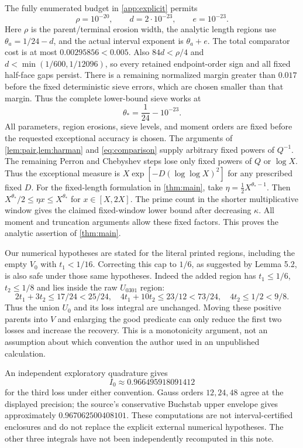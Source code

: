 The fully enumerated budget in \cref{app:explicit} permits
\[
 \rho=10^{-20},\qquad d=2\cdot10^{-23},\qquad e=10^{-23}.
\]
Here $\rho$ is the parent/terminal erosion width, the analytic
length regions use $\theta_a=1/24-d$, and the actual interval
exponent is $\theta_a+e$.
The total comparator cost is at most $0.00295856<0.005$.
Also $84d<\rho/4$ and $d<\min(1/600,1/12096)$, so every retained
endpoint-order sign and all fixed half-face gaps persist.
There is a remaining normalized margin greater than $0.017$ before
the fixed deterministic sieve errors, which are chosen smaller
than that margin. Thus the complete lower-bound sieve works at
\[
                 \theta_*=\frac1{24}-10^{-23}.
\]
All parameters, region erosions, sieve levels, and moment orders
are fixed before the requested exceptional accuracy is chosen.
The arguments of \cref{lem:pair,lem:harman} and
\eqref{eq:comparison} supply arbitrary fixed powers of
$Q^{-1}$.
The remaining Perron and Chebyshev steps lose only fixed powers of
$Q$ or $\log X$.
Thus the exceptional measure is
$X\exp[-D(\log\log X)^2]$ for any prescribed fixed $D$.
For the fixed-length formulation in \cref{thm:main}, take
$\eta=\tfrac12 X^{\theta_*-1}$. Then
$X^{\theta_*}/2\le\eta x\le X^{\theta_*}$ for $x\in[X,2X]$.
The prime count in the shorter multiplicative window gives the
claimed fixed-window lower bound after decreasing $\kappa$.
All moment and truncation arguments allow these fixed factors.
This proves the analytic assertion of \cref{thm:main}.

\begin{remark}
Our numerical hypotheses are stated for the literal printed regions,
including the empty $V_0$ with $t_1<1/16$.
Correcting this cap to $1/6$, as suggested by Lemma 5.2, is also safe
under those same hypotheses. Indeed the added region has
$t_1\le1/6$, $t_2\le1/8$ and lies inside the raw $U_{0301}$ region:
\[
 2t_1+3t_2\le17/24<25/24,\quad
 4t_1+10t_2\le23/12<73/24,\quad 4t_2\le1/2<9/8.
\]
Thus the union $U_0$ and its loss integral are unchanged.
Moving these positive parents into $V$ and enlarging the good predicate
can only reduce the first two losses and increase the recovery.
This is a monotonicity argument, not an assumption about which
convention the author used in an unpublished calculation.

An independent exploratory quadrature gives
\[
 I_0\approx0.966495918091412
\]
for the third loss under either convention. Gauss orders $12,24,48$
agree at the displayed precision; the source's conservative Buchstab
upper envelope gives approximately $0.967062500408101$.
These computations are not interval-certified enclosures and do not
replace the explicit external numerical hypotheses. The other three
integrals have not been independently recomputed in this note.
\end{remark}


